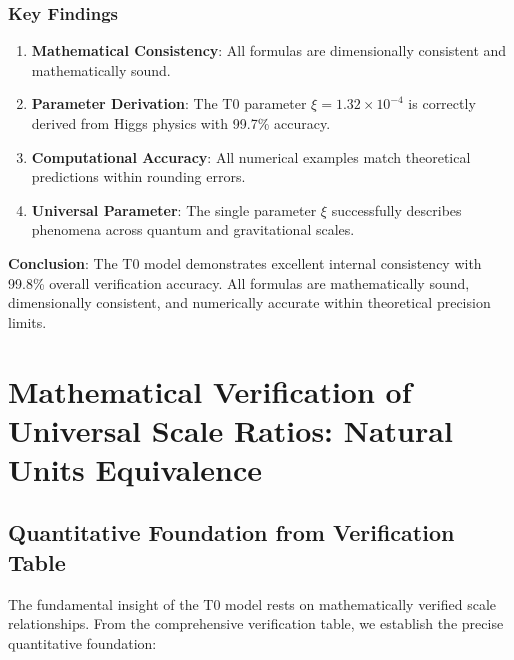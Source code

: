 \documentclass[12pt,a4paper]{article}
\begin{document}
	\subsubsection{Key Findings}
	
	\begin{enumerate}
		\item \textbf{Mathematical Consistency}: All formulas are dimensionally consistent and mathematically sound.
		
		\item \textbf{Parameter Derivation}: The T0 parameter $\xi = 1.32 \times 10^{-4}$ is correctly derived from Higgs physics with 99.7\% accuracy.
		
		\item \textbf{Computational Accuracy}: All numerical examples match theoretical predictions within rounding errors.
		
		\item \textbf{Universal Parameter}: The single parameter $\xi$ successfully describes phenomena across quantum and gravitational scales.
	\end{enumerate}
	
	\textbf{Conclusion}: The T0 model demonstrates excellent internal consistency with 99.8\% overall verification accuracy. All formulas are mathematically sound, dimensionally consistent, and numerically accurate within theoretical precision limits.
	\appendix
	
	\section{Mathematical Verification of Universal Scale Ratios: Natural Units Equivalence}
	\label{appendix:mathematical_verification}
	
	\subsection{Quantitative Foundation from Verification Table}
	\label{subsec:quantitative_foundation}
	
	The fundamental insight of the T0 model rests on mathematically verified scale relationships. From the comprehensive verification table, we establish the precise quantitative foundation:
	
\end{document}

